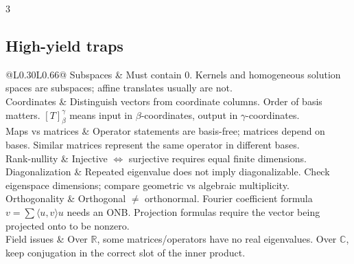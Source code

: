 \documentclass[10pt]{article}
\makeatletter
\newcommand{\R}{\mathbb{R}}
\newcommand{\C}{\mathbb{C}}
\newcommand{\ip}[2]{\langle #1,#2\rangle}
\newcommand{\cheattable}[1]{\begin{tabular}{@{}L{0.30\columnwidth}L{0.66\columnwidth}@{}}#1\end{tabular}}
\makeatother
\begin{document}
\begin{multicols}{3}
\subsection*{High-yield traps}
\cheattable{
Subspaces & Must contain $0$. Kernels and homogeneous solution spaces are subspaces; affine translates usually are not.\\
Coordinates & Distinguish vectors from coordinate columns. Order of basis matters. $[T]^\gamma_\beta$ means input in $\beta$-coordinates, output in $\gamma$-coordinates.\\
Maps vs matrices & Operator statements are basis-free; matrices depend on bases. Similar matrices represent the same operator in different bases.\\
Rank-nullity & Injective $\Leftrightarrow$ surjective requires equal finite dimensions.\\
Diagonalization & Repeated eigenvalue does not imply diagonalizable. Check eigenspace dimensions; compare geometric vs algebraic multiplicity.\\
Orthogonality & Orthogonal $\neq$ orthonormal. Fourier coefficient formula $v=\sum\ip{u}{v}u$ needs an ONB. Projection formulas require the vector being projected onto to be nonzero.\\
Field issues & Over $\R$, some matrices/operators have no real eigenvalues. Over $\C$, keep conjugation in the correct slot of the inner product.\\
}

\end{multicols}
\end{document}

